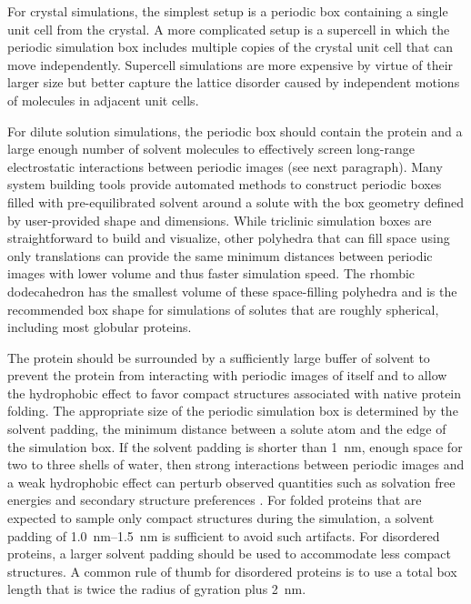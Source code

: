 \documentclass[9pt,review]{livecoms}
\begin{document}
For crystal simulations, the simplest setup is a periodic box containing a single unit cell from the crystal.
A more complicated setup is a supercell in which the periodic simulation box includes multiple copies of the crystal unit cell that can move independently.
Supercell simulations are more expensive by virtue of their larger size but better capture the lattice disorder caused by independent motions of molecules in adjacent unit cells.

For dilute solution simulations, the periodic box should contain the protein and a large enough number of solvent molecules to effectively screen long-range electrostatic interactions between periodic images (see next paragraph).
Many system building tools provide automated methods to construct periodic boxes filled with pre-equilibrated solvent around a solute with the box geometry defined by user-provided shape and dimensions.
While triclinic simulation boxes are straightforward to build and visualize, other polyhedra that can fill space using only translations can provide the same minimum distances between periodic images with lower volume and thus faster simulation speed.
The rhombic dodecahedron \cite{wang_superposition_1972} has the smallest volume of these space-filling polyhedra and is the recommended box shape for simulations of solutes that are roughly spherical, including most globular proteins.

The protein should be surrounded by a sufficiently large buffer of solvent to prevent the protein from interacting with periodic images of itself and to allow the hydrophobic effect to favor compact structures associated with native protein folding.
The appropriate size of the periodic simulation box is determined by the solvent padding, the minimum distance between a solute atom and the edge of the simulation box.
If the solvent padding is shorter than \qty{1}{\nano\meter}, enough space for two to three shells of water, then strong interactions between periodic images and a weak hydrophobic effect can perturb observed quantities such as solvation free energies and secondary structure preferences 
\cite{mehra_cell_2019,gapsys_importance_2020}.
For folded proteins that are expected to sample only compact structures during the simulation, a solvent padding of \qtyrange{1.0}{1.5}{\nano\meter} is sufficient to avoid such artifacts.
For disordered proteins, a larger solvent padding should be used to accommodate less compact structures.
A common rule of thumb for disordered proteins is to use a total box length that is twice the radius of gyration plus \qty{2}{\nano\meter}.
\end{document}
